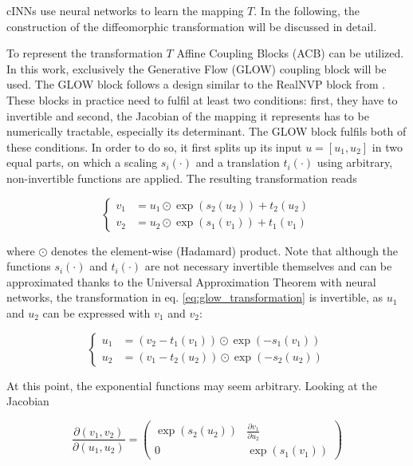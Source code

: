 cINNs use neural networks to learn the mapping $T$. In the following, the construction of the diffeomorphic transformation will be discussed in detail.


To represent the transformation $T$ Affine Coupling Blocks (ACB) can be utilized. In this work, exclusively the Generative Flow (GLOW) coupling block \cite{glow_paper} will be used. The GLOW block follows a design similar to the RealNVP block from \cite{RealNVP}. These blocks in practice need to fulfil at least two conditions: first, they have to invertible and second, the Jacobian of the mapping it represents has to be numerically tractable, especially its determinant. The GLOW block fulfils both of these conditions. In order to do so, it first splits up its input $u = [u_1, u_2]$ in two equal parts, on which a scaling $s_i(\cdot)$ and a translation $t_i(\cdot)$ using arbitrary, non-invertible functions are applied. The resulting transformation reads

\begin{equation}
	\left\{\begin{aligned}
		v_1 &= u_1 \odot \exp(s_2(u_2)) + t_2(u_2) \\
		v_2 &= u_2 \odot \exp(s_1(v_1)) + t_1(v_1)
	\end{aligned}\right.
	\label{eq:glow_transformation}
\end{equation}

where $\odot$ denotes the element-wise (Hadamard) product. Note that although the functions $s_i(\cdot)$ and $t_i(\cdot)$ are not necessary invertible themselves and can be approximated thanks to the Universal Approximation Theorem with neural networks, the transformation in eq. \ref{eq:glow_transformation} is invertible, as $u_1$ and $u_2$ can be expressed with $v_1$ and $v_2$:

\begin{equation*}
	\left\{\begin{aligned}
		u_1 &= (v_2 - t_1(v_1)) \odot \exp(-s_1(v_1)) \\
		u_2 &= (v_1 - t_2(u_2)) \odot \exp(-s_2(u_2)) 
	\end{aligned}\right.
\end{equation*}

At this point, the exponential functions may seem arbitrary. Looking at the Jacobian

\begin{equation*}
	\frac{\partial (v_1, v_2)}{\partial(u_1, u_2)} = \left(\begin{matrix}
		\exp(s_2(u_2)) & \frac{\partial v_1}{\partial u_2} \\
		0             & \exp(s_1(v_1))
	\end{matrix}\right)
\end{equation*}

